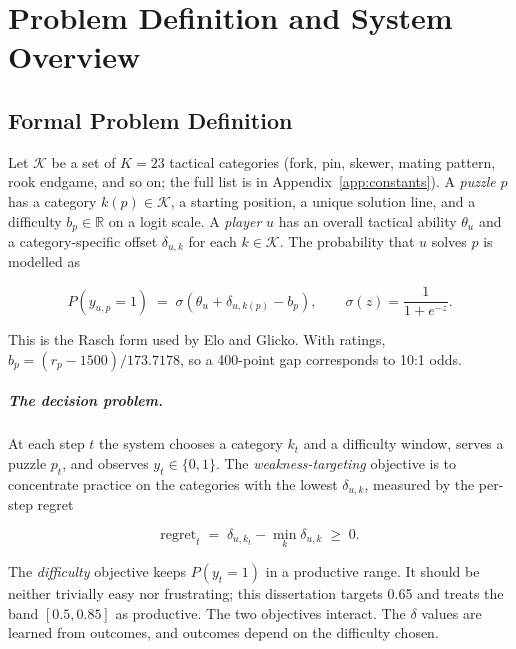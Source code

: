 \chapter{Problem Definition and System Overview}\label{ch:problem}

\section{Formal Problem Definition}

Let $\mathcal{K}$ be a set of $K=23$ tactical categories (fork, pin, skewer, mating pattern, rook
endgame, and so on; the full list is in Appendix~\ref{app:constants}). A \emph{puzzle} $p$ has a
category $k(p)\in\mathcal{K}$, a starting position, a unique solution line, and a difficulty
$b_p\in\mathbb{R}$ on a logit scale. A \emph{player} $u$ has an overall tactical ability $\theta_u$
and a category-specific offset $\delta_{u,k}$ for each $k\in\mathcal{K}$. The probability that $u$
solves $p$ is modelled as

\begin{equation}\label{eq:rasch}
  P(y_{u,p}=1) \;=\; \sigma\!\left(\theta_u + \delta_{u,k(p)} - b_p\right),
  \qquad \sigma(z) = \frac{1}{1+e^{-z}} .
\end{equation}

\noindent This is the Rasch form used by Elo and Glicko. With ratings, $b_p=(r_p-1500)/173.7178$, so
a 400-point gap corresponds to 10:1 odds.

\paragraph{The decision problem.} At each step $t$ the system chooses a category $k_t$ and a
difficulty window, serves a puzzle $p_t$, and observes $y_t\in\{0,1\}$. The \emph{weakness-targeting}
objective is to concentrate practice on the categories with the lowest $\delta_{u,k}$, measured by
the per-step regret

\begin{equation}\label{eq:regret}
  \mathrm{regret}_t \;=\; \delta_{u,k_t} - \min_{k}\delta_{u,k} \;\geq\; 0 .
\end{equation}

\noindent The \emph{difficulty} objective keeps $P(y_t=1)$ in a productive range. It should be
neither trivially easy nor frustrating; this dissertation targets 0.65 and treats the band
$[0.5,0.85]$ as productive. The two objectives interact. The $\delta$ values are learned from
outcomes, and outcomes depend on the difficulty chosen.

